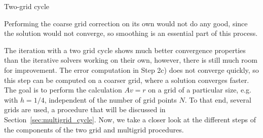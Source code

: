 \begin{algorithm}
\vspace{5mm}
\label{alg:two_grid_cycle}
\caption{Two-grid cycle}
\end{algorithm}

Performing the coarse grid correction on its own would not do any good, since the solution would not converge, so smoothing is an essential part of this process. 


The iteration with a two grid cycle shows much better convergence properties than the iterative solvers working on their own, however, there is still much room for improvement. The error computation in Step 2c) does not converge quickly, so this step can be computed on a coarser grid, where a solution converges faster. The goal is to perform the calculation $Av = r$ on a grid of a particular size, e.g. with $h = 1/4$, independent of the number of grid points $N$. To that end, several grids are used, a procedure that will be discussed in Section~\ref{sec:multigrid_cycle}. Now, we take a closer look at the different steps of the components of the two grid and multigrid procedures.%


